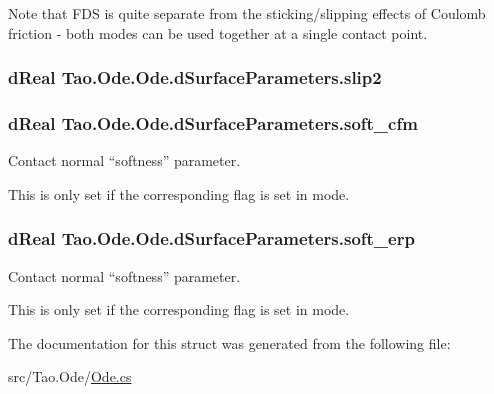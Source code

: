 Note that FDS is quite separate from the sticking/slipping effects of Coulomb friction -\/ both modes can be used together at a single contact point. \hypertarget{struct_tao_1_1_ode_1_1_ode_1_1d_surface_parameters_af7197edb7b0a6bb33e1d20298e7bed79}{
\subsubsection[{slip2}]{\setlength{\rightskip}{0pt plus 5cm}dReal {\bf Tao.Ode.Ode.dSurfaceParameters.slip2}}}
\label{struct_tao_1_1_ode_1_1_ode_1_1d_surface_parameters_af7197edb7b0a6bb33e1d20298e7bed79}
\hypertarget{struct_tao_1_1_ode_1_1_ode_1_1d_surface_parameters_adb1e3b96c1e72c91f5f2a08efdcb8261}{
\subsubsection[{soft\_\-cfm}]{\setlength{\rightskip}{0pt plus 5cm}dReal {\bf Tao.Ode.Ode.dSurfaceParameters.soft\_\-cfm}}}
\label{struct_tao_1_1_ode_1_1_ode_1_1d_surface_parameters_adb1e3b96c1e72c91f5f2a08efdcb8261}


Contact normal ``softness'' parameter. 

This is only set if the corresponding flag is set in mode. \hypertarget{struct_tao_1_1_ode_1_1_ode_1_1d_surface_parameters_a8823dedc4e6e8a71f5ac77c64e5e78e0}{
\subsubsection[{soft\_\-erp}]{\setlength{\rightskip}{0pt plus 5cm}dReal {\bf Tao.Ode.Ode.dSurfaceParameters.soft\_\-erp}}}
\label{struct_tao_1_1_ode_1_1_ode_1_1d_surface_parameters_a8823dedc4e6e8a71f5ac77c64e5e78e0}


Contact normal ``softness'' parameter. 

This is only set if the corresponding flag is set in mode. 

The documentation for this struct was generated from the following file:\begin{DoxyCompactItemize}
\item 
src/Tao.Ode/\hyperlink{_ode_8cs}{Ode.cs}\end{DoxyCompactItemize}
